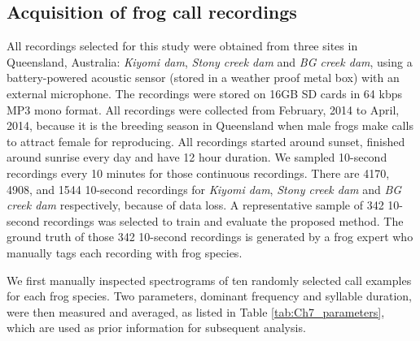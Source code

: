 \subsection{Acquisition of frog call recordings}
All recordings selected for this study were obtained from three sites in Queensland, Australia: \textit{Kiyomi dam}, \textit{Stony creek dam} and  \textit{BG creek dam}, using a battery-powered acoustic sensor (stored in a weather proof metal box) with an external microphone. The recordings were stored on 16GB SD cards in 64 kbps MP3 mono format. All recordings were collected from February, 2014 to April, 2014, because it is the breeding season in Queensland when male frogs make calls to attract female for reproducing. All recordings started around sunset, finished around sunrise every day and have 12 hour duration. We sampled 10-second recordings every 10 minutes for those continuous recordings. There are 4170, 4908, and 1544 10-second recordings for \textit{Kiyomi dam}, \textit{Stony creek dam} and \textit{BG creek dam} respectively, because of data loss. A representative sample of 342 10-second recordings was selected to train and evaluate the proposed method. The ground truth of those 342 10-second recordings is generated by a frog expert who manually tags each recording with frog species.

We first manually inspected spectrograms of ten randomly selected call examples for each frog species. Two parameters, dominant frequency and syllable duration, were then measured and averaged, as listed in Table \ref{tab:Ch7_parameters}, which are used as prior information for subsequent analysis.


